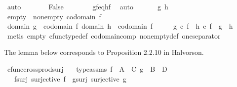 \begin{isabellebody}
\ auto\isanewline
\ \ \ \ \isamarkupfalse%
\ \isamarkupfalse%
\ False\isanewline
\ \ \ \ \ \ \isamarkupfalse%
\ gf{\isacharunderscore}{\kern0pt}eq{\isacharunderscore}{\kern0pt}hf\ \isamarkupfalse%
\ auto\isanewline
\ \ \isamarkupfalse%
\isanewline
{}\isamarkupfalse%
\isanewline
\ \ \isamarkupfalse%
\ g\ h\isanewline
\ \ \isamarkupfalse%
\ empty{\isacharcolon}{\kern0pt}\ {\isachardoublequoteopen}{\isasymnot}\ nonempty\ {\isacharparenleft}{\kern0pt}codomain\ f{\isacharparenright}{\kern0pt}{\isachardoublequoteclose}\isanewline
\ \ \isamarkupfalse%
\ {\isachardoublequoteopen}domain\ g\ {\isacharequal}{\kern0pt}\ codomain\ f{\isachardoublequoteclose}\ {\isachardoublequoteopen}domain\ h\ {\isacharequal}{\kern0pt}\ codomain\ f{\isachardoublequoteclose}\isanewline
\ \ \isamarkupfalse%
\ \isamarkupfalse%
\ {\isachardoublequoteopen}g\ {\isasymcirc}\isactrlsub c\ f\ {\isacharequal}{\kern0pt}\ h\ {\isasymcirc}\isactrlsub c\ f\ {\isasymLongrightarrow}\ g\ {\isacharequal}{\kern0pt}\ h{\isachardoublequoteclose}\isanewline
\ \ \ \ \isamarkupfalse%
\ {\isacharparenleft}{\kern0pt}metis\ empty\ cfunc{\isacharunderscore}{\kern0pt}type{\isacharunderscore}{\kern0pt}def\ codomain{\isacharunderscore}{\kern0pt}comp\ nonempty{\isacharunderscore}{\kern0pt}def\ one{\isacharunderscore}{\kern0pt}separator{\isacharparenright}{\kern0pt}\isanewline
{}\isamarkupfalse%
%
\endisatagproof
{\isafoldproof}%
%
\isadelimproof
%
\endisadelimproof
%
\begin{isamarkuptext}%
The lemma below corresponds to Proposition 2.2.10 in Halvorson.%
\end{isamarkuptext}\isamarkuptrue%
\isamarkupfalse%
\ cfunc{\isacharunderscore}{\kern0pt}cross{\isacharunderscore}{\kern0pt}prod{\isacharunderscore}{\kern0pt}surj{\isacharcolon}{\kern0pt}\isanewline
\ \ \ type{\isacharunderscore}{\kern0pt}assms{\isacharcolon}{\kern0pt}\ {\isachardoublequoteopen}f\ {\isacharcolon}{\kern0pt}\ A\ {\isasymrightarrow}\ C{\isachardoublequoteclose}\ {\isachardoublequoteopen}g\ {\isacharcolon}{\kern0pt}\ B\ {\isasymrightarrow}\ D{\isachardoublequoteclose}\isanewline
\ \ \ f{\isacharunderscore}{\kern0pt}surj{\isacharcolon}{\kern0pt}\ {\isachardoublequoteopen}surjective\ f{\isachardoublequoteclose}\ \ g{\isacharunderscore}{\kern0pt}surj{\isacharcolon}{\kern0pt}\ {\isachardoublequoteopen}surjective\ g{\isachardoublequoteclose}\isanewline

\end{isabellebody}
